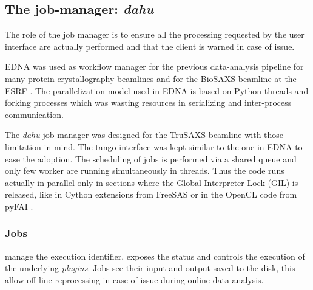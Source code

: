 \documentclass[preprint]{iucr}              %
\begin{document}
\subsection{The job-manager: \textit{dahu}}

The role of the job manager is to ensure all the processing requested by the user interface are actually performed and that the client is warned in case of issue.

EDNA was used as workflow manager for the previous data-analysis pipeline for many protein crystallography beamlines \cite{edna} and for the BioSAXS beamline at the ESRF \cite{BM29ODA}.
The parallelization model used in EDNA is based on Python threads and forking processes which was wasting resources in serializing and inter-process communication. 
 
The \textit{dahu} job-manager was designed for the TruSAXS beamline \cite{id02_2022} with those limitation in mind. 
The tango interface \cite{tango} was kept similar to the one in EDNA to ease the adoption.
The scheduling of jobs is performed via a shared queue and only few worker are running simultaneously in threads.
Thus the code runs actually in parallel only in sections where the Global Interpreter Lock (GIL) is released, like in Cython extensions from FreeSAS or in the OpenCL code from pyFAI \cite{pyFAI_gpu}.

\subsubsection{Jobs}
manage the execution identifier, exposes the status and controls the execution of the underlying \textit{plugins}. %
Jobs see their input and output saved to the disk, this allow off-line reprocessing in case of issue during online data analysis.
\end{document}
